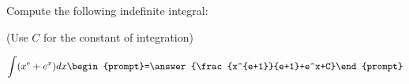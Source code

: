\documentclass{ximera}
\author{Jim Talamo}
\begin{document}
\begin{exercise}
Compute the following indefinite integral:

\begin{prompt} (Use $C$ for the constant of integration) \end{prompt}

\[
\int (x^{e}+e^x) dx 
\begin{prompt}=\answer{\frac{x^{e+1}}{e+1}+e^x+C}\end{prompt}
\]

\end{exercise}
\end{document}
